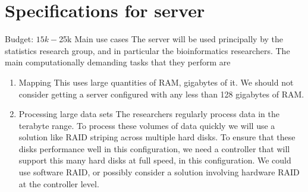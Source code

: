 \documentclass{amsart}
\begin{document}
\section{Specifications for server}
Budget: $15k-$25k
Main use cases
The server will be used principally by the statistics research group, and in particular the bioinformatics researchers. The main
computationally demanding tasks that they perform are
\begin{enumerate}
\item{Mapping} This uses large quantities of RAM, gigabytes of it. We should not
consider getting a server configured with any less than 128 gigabytes of RAM.
\item{Processing large data sets} The researchers regularly process data in the
terabyte range. To process these volumes of data quickly we will use a solution like
RAID striping across multiple hard disks. To ensure that these disks performance well
in this configuration, we need a controller that will support this many hard disks at
full speed, in this configuration. We could use software RAID, or possibly consider a
solution involving hardware RAID at the controller level.
\end{enumerate}
\end{document}
